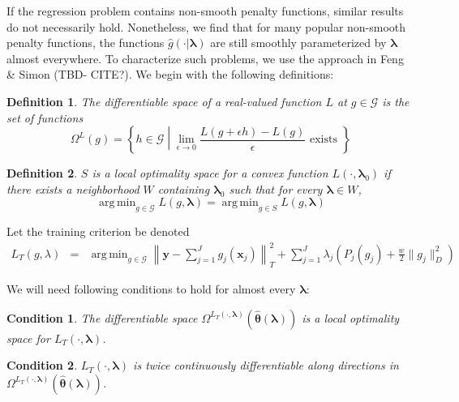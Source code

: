 \documentclass[12pt]{article}
\newtheorem{definition}{Definition}
\newtheorem{condition}{Condition}
\DeclareMathOperator*{\argmin}{arg\,min}
\begin{document}
If the regression problem contains non-smooth penalty functions, similar results do not necessarily hold. Nonetheless, we find that for many popular non-smooth penalty functions, the functions $\hat{g}(\cdot | \boldsymbol \lambda)$ are still smoothly parameterized by $\boldsymbol \lambda$ almost everywhere. To characterize such problems, we use the approach in Feng \& Simon (TBD- CITE?). We begin with the following definitions:

\begin{definition}
The differentiable space of a real-valued function $L$ at $g \in \mathcal{G}$ is the set of functions
\begin{equation}
\Omega^{L}(g) = \left \{ h \in \mathcal{G} \middle | \lim_{\epsilon \rightarrow 0} \frac{L(g + \epsilon h) - L(g)}{\epsilon} \text{ exists } \right \}
\end{equation}
\end{definition}

\begin{definition}
$S$ is a local optimality space for a convex function $L(\cdot, \boldsymbol \lambda_0)$ if there exists a neighborhood $W$ containing $\boldsymbol \lambda_0$ such that for every $\boldsymbol \lambda \in W$,
\begin{equation}
\argmin_{g \in \mathcal{G}} L(g, \boldsymbol \lambda) =
\argmin_{g \in S} L(g, \boldsymbol \lambda)
\end{equation}
\end{definition}

Let the training criterion be denoted
\begin{eqnarray*}
L_T(g, \lambda) &=& \argmin_{g\in \mathcal{G}} 
\left \| \boldsymbol y -  \sum_{j=1}^J g_j(\boldsymbol x_j) \right \|^2_T 
+ \sum_{j=1}^J \lambda_j \left ( P_j(g_j) + \frac{w}{2} \| g_j \|^2_D \right )
\end{eqnarray*}

We will need following conditions to hold for almost every $\boldsymbol{\lambda}$:
\begin{condition}
\label{condn:nonsmooth1}
The differentiable space $\Omega^{L_T(\cdot, \boldsymbol{\lambda})}(\hat{\boldsymbol \theta}\left(\boldsymbol{\lambda}\right))$ is a local optimality space for $L_T\left(\cdot,\boldsymbol{\lambda}\right)$.
\end{condition}
\begin{condition}
\label{condn:nonsmooth2}
$L_T(\cdot, \boldsymbol{\lambda})$ is twice continuously differentiable along directions in $\Omega^{L_T(\cdot, \boldsymbol{\lambda})}(\hat{\boldsymbol \theta}\left(\boldsymbol{\lambda}\right))$.
\end{condition}
\end{document}
